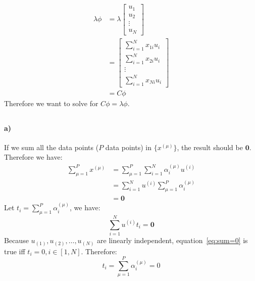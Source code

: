 \documentclass{article}
\begin{document}
\begin{align*}
\lambda\phi &= \lambda\begin{bmatrix}u_1 \\ u_2 \\ \vdots \\ u_N\end{bmatrix}\\
&= \begin{bmatrix}
\sum_{i=1}^{N}{x_{1i}u_i} \\
\sum_{i=1}^{N}{x_{2i}u_i} \\
\vdots \\
\sum_{i=1}^{N}{x_{Ni}u_i}
\end{bmatrix} \\
&= C\phi
\end{align*}
Therefore we want to solve for $C\phi=\lambda\phi$.


\subsection{}
\paragraph{a)} If we sum all the data points ($P$ data points) in $\{x^{(\mu)}\}$, the result should be $\mathbf{0}$. Therefore we have:
\begin{align*}
\sum_{\mu=1}^{P} x^{(\mu)}&= \sum_{\mu=1}^{P}\sum_{i=1}^{N}{\alpha_i^{(\mu)} u^{(i)}} \\
&= \sum_{i=1}^{N}u^{(i)}\sum_{\mu=1}^{P}{\alpha_i^{(\mu)}} \\
&= \mathbf{0}
\end{align*}
Let $t_i = \sum_{\mu=1}^{P}{\alpha_i^{(\mu)}}$, we have:
\begin{equation}
\label{eq:sum=0}
\sum_{i=1}^{N}u^{(i)}t_i = \mathbf{0}
\end{equation}
Because $u_{(1)}, u_{(2)}, \ldots, u_{(N)}$ are linearly independent, equation~\ref{eq:sum=0} is true iff $t_i = 0, i \in [1, N]$. Therefore:
$$t_i = \sum_{\mu=1}^{P}{\alpha_i^{(\mu)}} = 0$$
\end{document}
